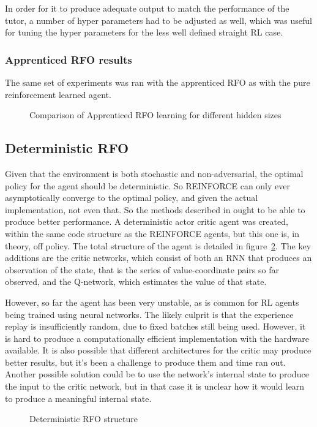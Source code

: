 In order for it to produce adequate output to match the performance of the tutor, a number of hyper parameters had to be adjusted as well, which was useful for tuning the hyper parameters for the less well defined straight RL case.

\subsubsection{Apprenticed RFO results}
The same set of experiments was ran with the apprenticed RFO as with the pure reinforcement learned agent. %

\begin{figure}
\centering

\caption{Comparison of Apprenticed RFO learning for different hidden sizes}
\label{fig:exp1apprfo}
\end{figure}


\subsection{Deterministic RFO}
\label{sec:detrfo}
Given that the environment is both stochastic and non-adversarial, the optimal policy for the agent should be deterministic. So REINFORCE can only ever asymptotically converge to the optimal policy, and given the actual implementation, not even that. So the methods described in \cite{DetContCont} ought to be able to produce better performance. A deterministic actor critic agent was created, within the same code structure as the REINFORCE agents, but this one is, in theory, off policy. The total structure of the agent is detailed in figure~\ref{fig:detrfo}. The key additions are the critic networks, which consist of both an RNN that produces an observation of the state, that is the series of value-coordinate pairs so far observed, and the Q-network, which estimates the value of that state.

However, so far the agent has been very unstable, as is common for RL agents being trained using neural networks. The likely culprit is that the experience replay is insufficiently random, due to fixed batches still being used. However, it is hard to produce a computationally efficient implementation with the hardware available. It is also possible that different architectures for the critic may produce better results, but it's been a challenge to produce them and time ran out. Another possible solution could be to use the network's internal state to produce the input to the critic network, but in that case it is unclear how it would learn to produce a meaningful internal state.

\begin{figure}
\centering

\caption{Deterministic RFO structure}
\label{fig:detrfo}
\end{figure}

